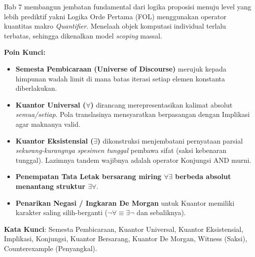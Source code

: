 \documentclass[../main]{subfiles}
\begin{document}
\begin{rangkuman}
Bab 7 membangun jembatan fundamental dari logika proposisi menuju level yang lebih prediktif yakni Logika Orde Pertama (FOL) menggunakan operator kuantitas makro \textit{Quantifier}. Menelaah objek komputasi individual terlalu terbatas, sehingga dikenalkan model \textit{scoping} massal.

\textbf{Poin Kunci:}
\begin{itemize}
  \item \textbf{Semesta Pembicaraan (Universe of Discourse)} merujuk kepada himpunan wadah limit di mana batas iterasi setiap elemen konstanta diberlakukan.
  \item \textbf{Kuantor Universal ($\forall$)} dirancang merepresentasikan kalimat absolut \textit{semua/setiap}. Pola translasinya mensyaratkan berpasangan dengan Implikasi agar maknanya valid.
  \item \textbf{Kuantor Eksistensial ($\exists$)} dikonstruksi menjembatani pernyataan parsial \textit{sekurang-kurangnya spesimen tunggal} pembawa sifat (saksi kebenaran tunggal). Lazimnya tandem wajibnya adalah operator Konjungsi AND murni.
  \item \textbf{Penempatan Tata Letak bersarang miring $\forall \exists$ berbeda absolut menantang struktur $\exists \forall$}. 
  \item \textbf{Penarikan Negasi / Ingkaran De Morgan} untuk Kuantor memiliki karakter saling silih-berganti ($\neg \forall \equiv \exists \neg$ dan sebaliknya). 
\end{itemize}

\textbf{Kata Kunci}: Semesta Pembicaraan, Kuantor Universal, Kuantor Eksistensial, Implikasi, Konjungsi, Kuantor Bersarang, Kuantor De Morgan, Witness (Saksi), Counterexample (Penyangkal).
\end{rangkuman}

\ifSubfilesClassLoaded{
  \renewcommand{\bibname}{Daftar Pustaka}
  
  
}{}
\end{document}
